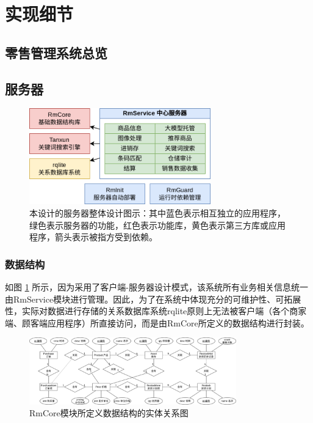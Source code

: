 \newpage
\section{实现细节}

\subsection{零售管理系统总览}
\label{sec:foundation}

\subsection{服务器}

\begin{figure}[htbp]
	\centering
	\includegraphics[width=0.7\textwidth]{./imgs/arch-server.png}
	\caption{本设计的服务器整体设计图示：其中蓝色表示相互独立的应用程序，绿色表示服务器的功能，红色表示功能库，黄色表示第三方库或应用程序，箭头表示被指方受到依赖。}
	\label{fig:arch-server}
\end{figure}

\subsubsection{数据结构}
如图 \ref{fig:arch-server} 所示，因为采用了客户端-服务器设计模式，该系统所有业务相关信息统一由RmService模块进行管理。因此，为了在系统中体现充分的可维护性、可拓展性，实际对数据进行存储的关系数据库系统rqlite原则上无法被客户端（各个商家端、顾客端应用程序）所直接访问，而是由RmCore所定义的数据结构进行封装。

\begin{figure}[htbp]
	\centering
	\includegraphics[width=0.8\textwidth]{./imgs/rms-er-rmcore.png}
	\caption{RmCore模块所定义数据结构的实体关系图}
	\label{fig:rms-er-rmcore}
\end{figure}

